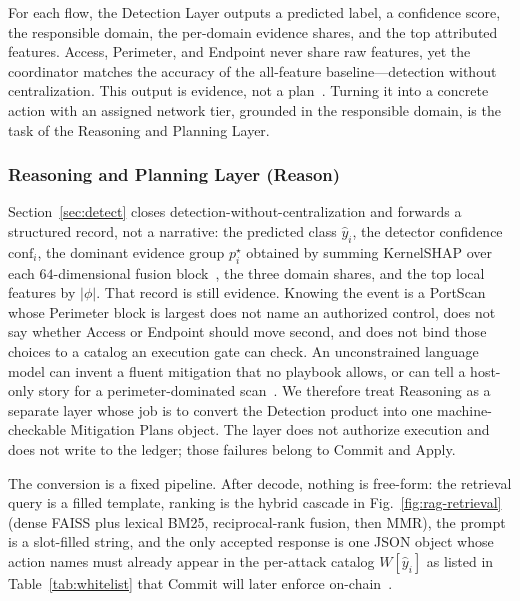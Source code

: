 \documentclass[10pt, conference]{IEEEtran}
\begin{document}
For each flow, the Detection Layer outputs a predicted label, a confidence score, the responsible domain, the per-domain evidence shares, and the top attributed features. Access, Perimeter, and Endpoint never share raw features, yet the coordinator matches the accuracy of the all-feature baseline---detection without centralization. This output is evidence, not a plan~\cite{li2025}. Turning it into a concrete action with an assigned network tier, grounded in the responsible domain, is the task of the Reasoning and Planning Layer.

\subsubsection{Reasoning and Planning Layer (Reason)}
\label{sec:reason}

Section~\ref{sec:detect} closes detection-without-centralization and forwards a structured record, not a narrative: the predicted class $\hat{y}_i$, the detector confidence $\mathrm{conf}_i$, the dominant evidence group $p_i^{\star}$ obtained by summing KernelSHAP over each $64$-dimensional fusion block~\cite{wu2023falcon}, the three domain shares, and the top local features by $\lvert\phi\rvert$. That record is still evidence. Knowing the event is a PortScan whose Perimeter block is largest does not name an authorized control, does not say whether Access or Endpoint should move second, and does not bind those choices to a catalog an execution gate can check. An unconstrained language model can invent a fluent mitigation that no playbook allows, or can tell a host-only story for a perimeter-dominated scan~\cite{xi2023,kshetri2025agentic,lazer2026}. We therefore treat Reasoning as a separate layer whose job is to convert the Detection product into one machine-checkable Mitigation Plans object. The layer does not authorize execution and does not write to the ledger; those failures belong to Commit and Apply.

The conversion is a fixed pipeline. After decode, nothing is free-form: the retrieval query is a filled template, ranking is the hybrid cascade in Fig.~\ref{fig:rag-retrieval} (dense FAISS plus lexical BM25, reciprocal-rank fusion, then MMR), the prompt is a slot-filled string, and the only accepted response is one JSON object whose action names must already appear in the per-attack catalog $W[\hat{y}_i]$ as listed in Table~\ref{tab:whitelist} that Commit will later enforce on-chain~\cite{li2025,jan2025}.
\end{document}
